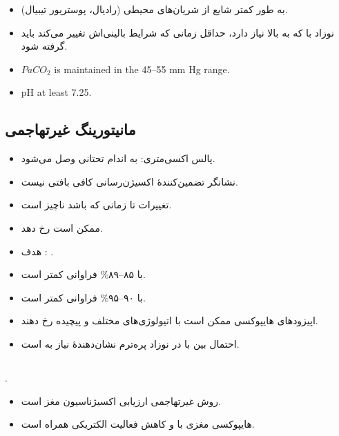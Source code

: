 \documentclass[12pt,a4paper]{article}
\begin{document}
\begin{itemize}
\item به طور کمتر شایع از شریان‌های محیطی (رادیال، پوستریور تیبیال).
\item نوزاد با  که به  بالا نیاز دارد، حداقل زمانی که شرایط بالینی‌اش تغییر می‌کند باید  گرفته شود.
\end{itemize}
\begin{latin}
\begin{itemize}
\item \(PaCO_2\) is maintained in the 45--55 mm Hg range.
\item pH at least 7.25.
\end{itemize}
\end{latin}
\subsection*{مانیتورینگ غیرتهاجمی}
\begin{itemize}
\item پالس اکسی‌متری: به اندام تحتانی وصل می‌شود.
\item {} نشانگر تضمین‌کنندهٔ اکسیژن‌رسانی کافی بافتی نیست.
\item تغییرات  تا زمانی که  باشد ناچیز است.
\item ممکن است  رخ دهد.
\item هدف : .
\item {} با  ۸۵–۸۹\% فراوانی کمتر است.
\item {} با  ۹۰–۹۵\% فراوانی کمتر است.
\item اپیزودهای هایپوکسی ممکن است با اتیولوژی‌های مختلف و پیچیده رخ دهند.
\item احتمال بین  با  در نوزاد پره‌ترم نشان‌دهندهٔ نیاز به   است.
\end{itemize}
\subsection*{}
.
\begin{itemize}
\item روش غیرتهاجمی ارزیابی اکسیژناسیون مغز است.
\item هایپوکسی مغزی با  و کاهش فعالیت الکتریکی همراه است.
\end{itemize}
\end{document}
